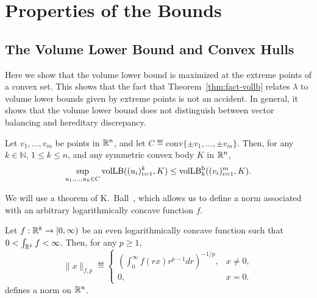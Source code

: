 \section{Properties of the Bounds}
\subsection{The Volume Lower Bound and Convex Hulls}
\label{sec:conv-hulls}

Here we show that the volume lower bound is maximized at the extreme
points of a convex set. This shows that the fact that
Theorem~\ref{thm:fact-vollb} relates $\lambda$ to volume lower bounds
given by extreme points is not an accident. In general, it shows that
the volume lower bound does not distinguish between vector balancing
and hereditary discrepancy. 

\begin{theorem}\label{thm:conv-hull}
  Let $v_1, \ldots, v_m$ be points in ${\mathbb{R}}^n$, and let $C \eqdef
  \mathrm{conv}\{\pm v_1, \ldots, \pm v_m\}$. Then, for any $k \in
  \mathbb{N}$, $1 \le k \le n$, and any symmetric convex body $K$ in
  ${\mathbb{R}}^n$,
  \[
  \sup_{u_1, \ldots, u_k \in C}\operatorname{volLB}((u_i)_{i = 1}^k, K)
  \le
  \operatorname{volLB}^{\rm h}_k((v_i)_{i = 1}^m, K).
  \]
\end{theorem}

We will use a theorem of K.~Ball~\cite{Ball88}, which allows us to
define a norm associated with an arbitrary logarithmically concave
function $f$.
\begin{theorem}\label{thm:ball-logconcave}
  Let $f: {\mathbb{R}}^k \to [0, \infty)$ be an even logarithmically concave
  function such that $0 < \int_{{\mathbb{R}}^k} f < \infty$. Then, for any $p
  \ge 1$, 
  \[
  \|x\|_{f,p} \eqdef 
  \begin{cases}
    \left(\int_0^\infty f(rx) r^{p-1}dr\right)^{-1/p}, &x \neq 0,\\
    0, &x = 0.
  \end{cases}
  \]
  defines a norm on ${\mathbb{R}}^n$. 
\end{theorem}


